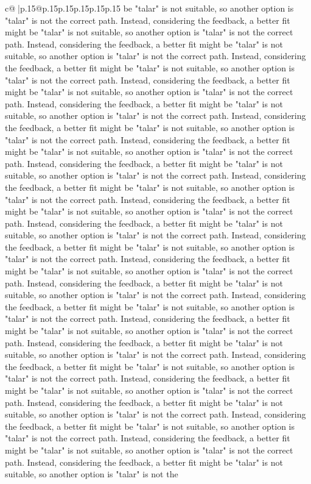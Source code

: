 \documentclass{article}
\begin{document}
{\begin{supertabular}{c@{$\;$}|p{.15\linewidth}@{}p{.15\linewidth}p{.15\linewidth}p{.15\linewidth}p{.15\linewidth}p{.15\linewidth}}
{{{be "talar" is not suitable, so another option is "talar" is not the correct path. Instead, considering the feedback, a better fit might be "talar" is not suitable, so another option is "talar" is not the correct path. Instead, considering the feedback, a better fit might be "talar" is not suitable, so another option is "talar" is not the correct path. Instead, considering the feedback, a better fit might be "talar" is not suitable, so another option is "talar" is not the correct path. Instead, considering the feedback, a better fit might be "talar" is not suitable, so another option is "talar" is not the correct path. Instead, considering the feedback, a better fit might be "talar" is not suitable, so another option is "talar" is not the correct path. Instead, considering the feedback, a better fit might be "talar" is not suitable, so another option is "talar" is not the correct path. Instead, considering the feedback, a better fit might be "talar" is not suitable, so another option is "talar" is not the correct path. Instead, considering the feedback, a better fit might be "talar" is not suitable, so another option is "talar" is not the correct path. Instead, considering the feedback, a better fit might be "talar" is not suitable, so another option is "talar" is not the correct path. Instead, considering the feedback, a better fit might be "talar" is not suitable, so another option is "talar" is not the correct path. Instead, considering the feedback, a better fit might be "talar" is not suitable, so another option is "talar" is not the correct path. Instead, considering the feedback, a better fit might be "talar" is not suitable, so another option is "talar" is not the correct path. Instead, considering the feedback, a better fit might be "talar" is not suitable, so another option is "talar" is not the correct path. Instead, considering the feedback, a better fit might be "talar" is not suitable, so another option is "talar" is not the correct path. Instead, considering the feedback, a better fit might be "talar" is not suitable, so another option is "talar" is not the correct path. Instead, considering the feedback, a better fit might be "talar" is not suitable, so another option is "talar" is not the correct path. Instead, considering the feedback, a better fit might be "talar" is not suitable, so another option is "talar" is not the correct path. Instead, considering the feedback, a better fit might be "talar" is not suitable, so another option is "talar" is not the correct path. Instead, considering the feedback, a better fit might be "talar" is not suitable, so another option is "talar" is not the correct path. Instead, considering the feedback, a better fit might be "talar" is not suitable, so another option is "talar" is not the correct path. Instead, considering the feedback, a better fit might be "talar" is not suitable, so another option is "talar" is not the correct path. Instead, considering the feedback, a better fit might be "talar" is not suitable, so another option is "talar" is not the correct path. Instead, considering the feedback, a better fit might be "talar" is not suitable, so another option is "talar" is not the }}}
\end{supertabular}}
\end{document}

